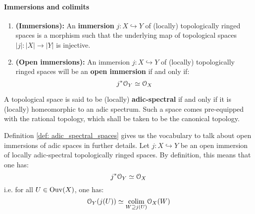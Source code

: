                 \paragraph{Immersions and colimits}
                    \begin{definition} \label{def: immersions_of_topologically_ringed_spaces}
                        \noindent
                        \begin{enumerate}
                            \item \textbf{(Immersions):} An \textbf{immersion} $j: X \hookrightarrow Y$ of (locally) topologically ringed spaces is a morphism such that the underlying map of topological spaces $|j|: |X| \to |Y|$ is injective. 
                            \item \textbf{(Open immersions):} An immersion $j: X \hookrightarrow Y$ of (locally) topologically ringed spaces will be an \textbf{open immersion} if and only if:
                                $$j^*\mathcal{O}_Y \simeq \mathcal{O}_X$$
                        \end{enumerate}
                    \end{definition}
                    
                    \begin{definition} \label{def: adic_spectral_spaces}
                        A topological space is said to be (locally) \textbf{adic-spectral} if and only if it is (locally) homeomorphic to an adic spectrum. Such a space comes pre-equipped with the rational topology, which shall be taken to be the canonical topology.
                    \end{definition}
                    \begin{remark} \label{remark: open_immersions_of_adic_spaces}
                        Definition \ref{def: adic_spectral_spaces} gives us the vocabulary to talk about open immersions of adic spaces in further details. Let $j: X \hookrightarrow Y$ be an open immersion of locally adic-spectral topologically ringed spaces. By definition, this means that one has:
                            $$j^* \mathcal{O}_Y \simeq \mathcal{O}_X$$
                        i.e. for all $U \in \mathrm{Ouv}(X)$, one has:
                            $$\mathcal{O}_Y(j(U)) \simeq \underset{W \supseteq j(U)}{\operatorname{colim}} \mathcal{O}_X(W)$$
                    \end{remark}
                    
                    \begin{remark} \label{remark: closed_immersions_of_adic_spaces}
                        
                    \end{remark}
                    
